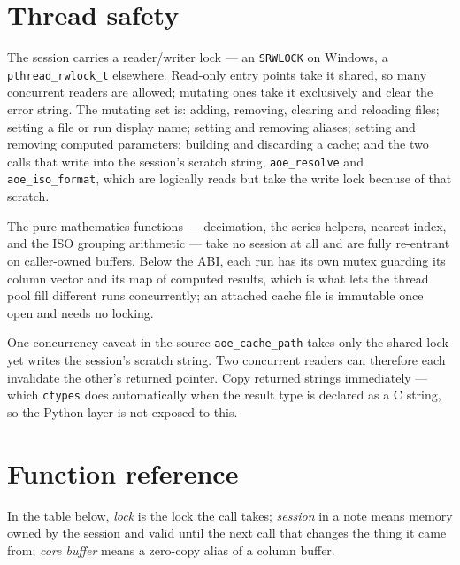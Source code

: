 \documentclass[11pt,a4paper,oneside]{report}
\newcommand{\code}[1]{\texttt{#1}}
\begin{document}
\section{Thread safety}

The session carries a reader/writer lock --- an \code{SRWLOCK} on Windows, a
\code{pthread\_rwlock\_t} elsewhere. Read-only entry points take it shared, so
many concurrent readers are allowed; mutating ones take it exclusively and clear
the error string. The mutating set is: adding, removing, clearing and reloading
files; setting a file or run display name; setting and removing aliases; setting
and removing computed parameters; building and discarding a cache; and the two
calls that write into the session's scratch string, \code{aoe\_resolve} and
\code{aoe\_iso\_format}, which are logically reads but take the write lock
because of that scratch.

The pure-mathematics functions --- decimation, the series helpers,
nearest-index, and the ISO grouping arithmetic --- take no session at all and
are fully re-entrant on caller-owned buffers. Below the ABI, each run has its
own mutex guarding its column vector and its map of computed results, which is
what lets the thread pool fill different runs concurrently; an attached cache
file is immutable once open and needs no locking.

\begin{aoelimit}{One concurrency caveat in the source}
\code{aoe\_cache\_path} takes only the shared lock yet writes the session's
scratch string. Two concurrent readers can therefore each invalidate the other's
returned pointer. Copy returned strings immediately --- which \code{ctypes} does
automatically when the result type is declared as a C string, so the Python
layer is not exposed to this.
\end{aoelimit}

\section{Function reference}

In the table below, \emph{lock} is the lock the call takes; \emph{session} in a
note means memory owned by the session and valid until the next call that
changes the thing it came from; \emph{core buffer} means a zero-copy alias of a
column buffer.
\end{document}
